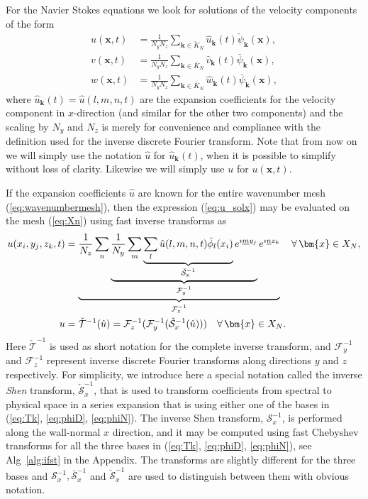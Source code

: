 \documentclass[preprint]{elsarticle}
\newcommand{\N}[1]{\check{#1}}
\newcommand{\D}[1]{\bar{#1}}
\begin{document}
For the Navier Stokes equations we look for solutions of the velocity 
components of the form
\begin{align}
u(\bm{x}, t) &= \frac{1}{N_yN_z}\sum_{\bm{k} \in \N{K}_N} \hat{u}_{\bm{k}}(t) 
\N{\psi}_{\bm{k}}(\bm{x}), \label{eq:u_solx} \\
v(\bm{x}, t) &= \frac{1}{N_yN_z}\sum_{\bm{k} \in \D{K}_N} \hat{v}_{\bm{k}}(t) 
\D{\psi}_{\bm{k}}(\bm{x}), \label{eq:u_soly} \\
w(\bm{x}, t) &= \frac{1}{N_yN_z}\sum_{\bm{k} \in \D{K}_N} \hat{w}_{\bm{k}}(t) 
\D{\psi}_{\bm{k}}(\bm{x}), \label{eq:u_solz}
\end{align}
where $\hat{u}_{\bm{k}}(t) = \hat{u}(l, {m}, {n}, t)$ are the expansion 
coefficients for the velocity component in $x$-direction (and similar for the 
other two components) and the scaling by $N_y$ and $N_z$ is merely for 
convenience 
and compliance with the definition used for the inverse discrete Fourier 
transform. Note that from now on we will simply use the notation $\hat{u}$ for 
$\hat{u}_{\bm{k}}(t)$, when it is possible to simplify without loss of clarity. 
Likewise we will simply use $u$ for $u(\bm{x}, t)$. 

If the expansion coefficients $\hat{u}$  are known for the entire wavenumber 
mesh (\ref{eq:wavenumbermesh}), then the expression (\ref{eq:u_solx}) may be 
evaluated on the mesh (\ref{eq:Xn}) using fast inverse transforms as
\begin{align}
u(x_i, y_j, z_k, t) &= \underbrace{\frac{1}{N_z}\sum_n 
\underbrace{\frac{1}{N_y} \sum_m \underbrace{\sum_l 
\hat{u}(l,m,n,t)\N{\phi}_l(x_i)}_{\N{\mathcal{S}}_x^{-1}} e^{\imath 
\underline{m} 
y_j}}_{\mathcal{F}_y^{-1}} e^{\imath \underline{n} z_k}}_{\mathcal{F}_z^{-1}} 
\quad \forall \, \bm{x} \in X_N, \notag \\
  u &= \N{\mathcal{T}}^{-1}(\hat{u}) =  \mathcal{F}^{-1}_z (\mathcal{F}^{-1}_y 
  (\N{\mathcal{S}}^{-1}_x (\hat{u}))) \quad \forall \, \bm{x} \in X_N.  
  \label{eq:ifft} 
\end{align}
Here $\N{\mathcal{T}}^{-1}$ is used as short notation for the complete inverse 
transform, and $\mathcal{F}_{y}^{-1}$ and $\mathcal{F}_{z}^{-1}$ represent inverse discrete
Fourier transforms along directions $y$ and $z$ respectively. For simplicity, we introduce here a special notation called the inverse 
\emph{Shen} transform, $\N{\mathcal{S}}^{-1}_x$, that is used to transform coefficients from spectral to physical space in a series expansion that is using either one of the bases in (\ref{eq:Tk}, \ref{eq:phiD}, \ref{eq:phiN}). The inverse Shen transform, $\mathcal{S}^{-1}_x$, is performed along the wall-normal 
$x$ direction, and it may be computed using fast 
Chebyshev transforms for all the three bases in (\ref{eq:Tk}, \ref{eq:phiD}, 
\ref{eq:phiN}), see Alg~\ref{alg:ifst} in the Appendix. The transforms are slightly different for the three 
bases and 
${\mathcal{S}}_x^{-1}, \D{\mathcal{S}}_x^{-1}$ and $\N{\mathcal{S}}_x^{-1}$ are used 
to distinguish between them with obvious notation. 
\end{document}
